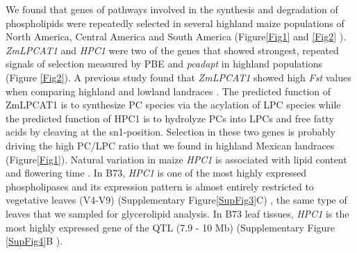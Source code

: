 \documentclass[9pt,twocolumn,twoside,lineno]{BioRxiv}
\begin{document}
We found that genes of pathways involved in the synthesis and degradation of phospholipids were repeatedly selected in several highland maize populations of North America, Central America and South America (Figure\ref{Fig1} and \ref{Fig2} ). 
\textit{ZmLPCAT1} and \textit{HPC1} were two of the genes that showed strongest, repeated signals of selection measured by PBE and \textit{pcadapt} in highland populations (Figure \ref{Fig2}). 
A previous study found that \textit{ZmLPCAT1} showed high \textit{Fst} values when comparing highland and lowland landraces \cite{Takuno2015-uj}.
The predicted function of ZmLPCAT1 is to synthesize PC species via the acylation of LPC species while the predicted function of HPC1 is to hydrolyze PCs into LPCs and free fatty acids by cleaving at the sn1-position.
Selection in these two genes is probably driving the high PC/LPC ratio that we found in highland Mexican landraces (Figure\ref{Fig1}).
Natural variation in maize \textit{HPC1} is associated with lipid content \cite{Riedelsheimer2012-bx} and flowering time \cite{Chen2012-gg, Hung2012-ms}. 
In B73, \textit{HPC1} is one of the most highly expressed phospholipases and its expression pattern is almost entirely restricted to vegetative leaves (V4-V9) (Supplementary Figure\ref{SupFig3}C) \cite{Stelpflug2016-vr}, the same type of leaves that we sampled for glycerolipid analysis. 
In B73 leaf tissues, \textit{HPC1} is the most highly expressed gene of the QTL (7.9 - 10 Mb) (Supplementary Figure \ref{SupFig4}B \cite{Stelpflug2016-vr}).
\end{document}
